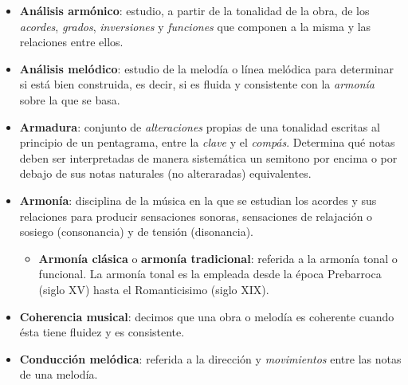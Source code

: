 \begin{itemize}[label={}, leftmargin=*]
\begin{itemize}
	\end{itemize}

	\bigskip

	\item \textbf{Análisis armónico}: estudio, a partir de la tonalidad de la obra, de los \textit{acordes}, \textit{grados}, \textit{inversiones} y \textit{funciones} que componen a la misma y las relaciones entre ellos.

	\bigskip

	\item \textbf{Análisis melódico}: estudio de la melodía o línea melódica para determinar si está bien construida, es decir, si es fluida y consistente con la \textit{armonía} sobre la que se basa.

	\bigskip

	\item \textbf{Armadura}: conjunto de \textit{alteraciones} propias de una tonalidad escritas al principio de un pentagrama, entre la \textit{clave} y el \textit{compás}. Determina qué notas deben ser interpretadas de manera sistemática un semitono por encima o por debajo de sus notas naturales (no alteraradas) equivalentes.

	\bigskip

	\item \textbf{Armonía}: disciplina de la música en la que se estudian los acordes y sus relaciones para producir sensaciones sonoras, sensaciones de relajación o sosiego (consonancia)  y de tensión (disonancia). 

	\begin{itemize}

		\item \textbf{Armonía clásica} o \textbf{armonía tradicional}: referida a la armonía tonal o funcional. La armonía tonal es la empleada desde la época Prebarroca (siglo XV) hasta el Romanticisimo (siglo XIX). 

	\end{itemize}

	\bigskip

	\item \textbf{Coherencia musical}: decimos que una obra o melodía es coherente cuando ésta tiene fluidez y es consistente.

	\bigskip

	\item \textbf{Conducción melódica}: referida a la dirección y \textit{movimientos} entre las notas de una melodía. 

	\bigskip


\end{itemize}
